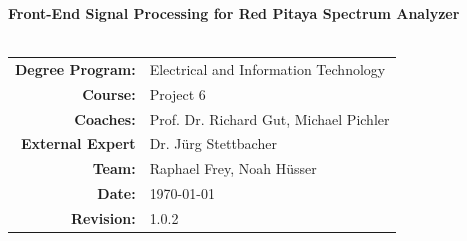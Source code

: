 \documentclass[a4paper,oneside]{alpenthesis/alpenthesis}
\begin{document}
%
%
\begin{titlingpage}
    \flushright\sffamily
    \enlargethispage{10ex}

    \vspace*{5em}
    
    \Huge\bfseries{Front-End Signal Processing for Red Pitaya Spectrum Analyzer}\\[1ex]
    \Large{}\\[3ex]

    \normalsize\mdseries

    

    \vfill
    \begin{tabular}{>{\bfseries}rl}
        Degree Program: & Electrical and Information Technology \\[2mm]
        Course:         & Project \num{6}\\[2mm]
        Coaches:        & Prof. Dr. Richard Gut, Michael Pichler \\[2mm]
        External Expert & Dr. J\"urg Stettbacher \\[2mm]
        Team:           & Raphael Frey, Noah H\"usser \\[2mm]
        Date:           & \today \\[2mm]
        Revision:       & 1.0.2 \\[2mm]
    \end{tabular}

    \tikzexternaldisable
    \tikzexternalenable
\end{titlingpage} %
\end{document}
